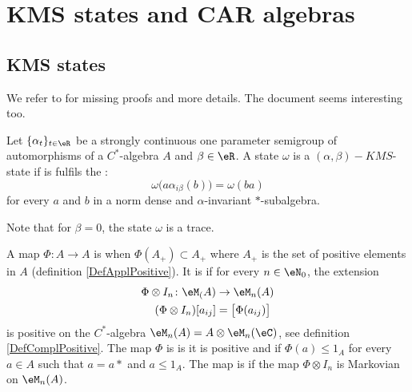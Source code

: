 \section{KMS states and CAR algebras}

\subsection{KMS states}

We refer to \cite{CirpianiDirichlet} for missing proofs and more details. The document \cite{VaesLocCompQG} seems interesting too.

\begin{definition}
	Let $\{ \alpha_t\}_{t\in\eR}$ be a strongly continuous one parameter semigroup of automorphisms of a $C^*$-algebra $A$ and $\beta\in\eR$. A state $\omega$ is a $(\alpha,\beta)-KMS$-state if is fulfils the :
	\begin{equation}		\label{EqKMScondPourOmega}
		\omega\big( a\alpha_{i\beta}(b) \big)=\omega(ba)
	\end{equation}
	for every $a$ and $b$ in a norm dense and $\alpha$-invariant $*$-subalgebra.
\end{definition}
Note that for $\beta=0$, the state $\omega$ is a trace.

A map $\Phi\colon A\to A$ is  when $\Phi(A_+)\subset A_+$ where $A_+$ is the set of positive elements in $A$ (definition \ref{DefApplPositive}). It is  if for every $n\in\eN_0$, the extension
\begin{equation}
	\begin{aligned}
		\Phi\otimes I_n\colon \eM_(A)&\to \eM_n(A) \\
		(\Phi\otimes I_n)[a_{ij}]&=\big[ \Phi(a_{ij}) \big] 
	\end{aligned}
\end{equation}
is positive on the $C^*$-algebra $\eM_n(A)=A\otimes\eM_n(\eC)$, see definition \ref{DefComplPositive}. The map $\Phi$ is  is it is positive and if $\Phi(a)\leq 1_A$ for every $a\in A$ such that $a=a*$ and $a\leq 1_A$. The map is  if the map $\Phi\otimes I_n$ is Markovian on $\eM_n(A)$.


